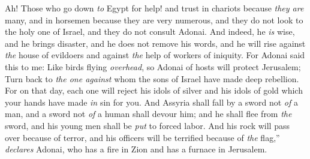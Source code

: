 \begin{biblechapter} %
 Ah! Those who go down \textit{to} Egypt for help!
\verse and trust in chariots because \textit{they are} many, 
and in horsemen because they are very numerous, 
and they do not look to the holy one of Israel, 
and they do not consult Adonai.
\verse And indeed, he \textit{is} wise, and he brings disaster, 
and he does not remove his words, 
and he will rise against \textit{the} house of evildoers 
and against \textit{the} help of workers of iniquity.
\verse For Adonai said this to me:
\verse Like birds flying \textit{overhead}, so Adonai of hosts will protect Jerusalem;
\verse Turn back to \textit{the one against} whom the sons of Israel have made deep rebellion.
\verse For on that day, each one will reject his idols of silver 
and his idols of gold which your hands have made \textit{in} sin for you.
\verse And Assyria shall fall by a sword not \textit{of} a man, 
and a sword not \textit{of} a human shall devour him; 
and he shall flee from \textit{the} sword, 
and his young men shall be \textit{put} to forced labor.
\verse And his rock will pass over because of terror, 
and his officers will be terrified because of \textit{the} flag,” 
\textit{declares} Adonai, 
who has a fire in Zion 
and has a furnace in Jerusalem.
\end{biblechapter}

